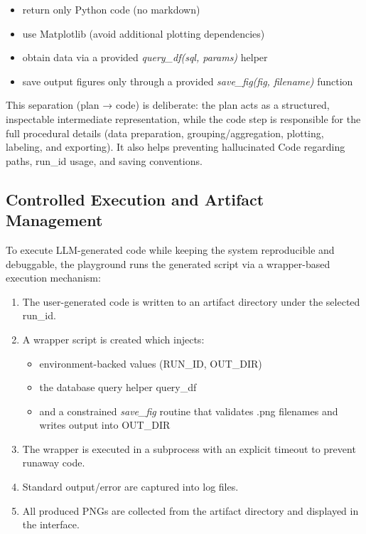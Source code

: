 \begin{itemize}
    \item return only Python code (no markdown)
    \item use Matplotlib (avoid additional plotting dependencies)
    \item obtain data via a provided \textit{query\_df(sql, params)} helper
    \item save output figures only through a provided \textit{save\_fig(fig, filename)} function
\end{itemize}

This separation (plan → code) is deliberate: the plan acts as a structured, inspectable intermediate representation, while the code step is responsible for the full procedural details (data preparation, grouping/aggregation, plotting, labeling, and exporting).
It also helps preventing hallucinated Code regarding paths, run\_id usage, and saving conventions.

\subsection{Controlled Execution and Artifact Management}

To execute LLM-generated code while keeping the system reproducible and debuggable, the playground runs the generated script via a wrapper-based execution mechanism:
\begin{enumerate}
    \item The user-generated code is written to an artifact directory under the selected run\_id.
    \item A wrapper script is created which injects:
          \begin{itemize}
              \item environment-backed values (RUN\_ID, OUT\_DIR)
              \item the database query helper query\_df
              \item and a constrained \textit{save\_fig} routine that validates .png filenames and writes output into OUT\_DIR
          \end{itemize}
    \item The wrapper is executed in a subprocess with an explicit timeout to prevent runaway code.
    \item Standard output/error are captured into log files.
    \item All produced PNGs are collected from the artifact directory and displayed in the interface.
\end{enumerate}

